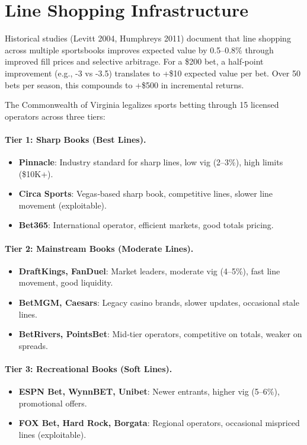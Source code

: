 \section{Line Shopping Infrastructure}
\label{sec:line_shopping}

Historical studies (Levitt 2004, Humphreys 2011) document that line shopping across multiple sportsbooks improves expected value by 0.5--0.8\% through improved fill prices and selective arbitrage. For a \$200 bet, a half‑point improvement (e.g., -3 vs -3.5) translates to +\$10 expected value per bet. Over 50 bets per season, this compounds to +\$500 in incremental returns.

The Commonwealth of Virginia legalizes sports betting through 15 licensed operators across three tiers:

\paragraph{Tier 1: Sharp Books (Best Lines).}
\begin{itemize}
\item \textbf{Pinnacle}: Industry standard for sharp lines, low vig (2--3\%), high limits (\$10K+).
\item \textbf{Circa Sports}: Vegas‑based sharp book, competitive lines, slower line movement (exploitable).
\item \textbf{Bet365}: International operator, efficient markets, good totals pricing.
\end{itemize}

\paragraph{Tier 2: Mainstream Books (Moderate Lines).}
\begin{itemize}
\item \textbf{DraftKings, FanDuel}: Market leaders, moderate vig (4--5\%), fast line movement, good liquidity.
\item \textbf{BetMGM, Caesars}: Legacy casino brands, slower updates, occasional stale lines.
\item \textbf{BetRivers, PointsBet}: Mid‑tier operators, competitive on totals, weaker on spreads.
\end{itemize}

\paragraph{Tier 3: Recreational Books (Soft Lines).}
\begin{itemize}
\item \textbf{ESPN Bet, WynnBET, Unibet}: Newer entrants, higher vig (5--6\%), promotional offers.
\item \textbf{FOX Bet, Hard Rock, Borgata}: Regional operators, occasional mispriced lines (exploitable).
\end{itemize}

